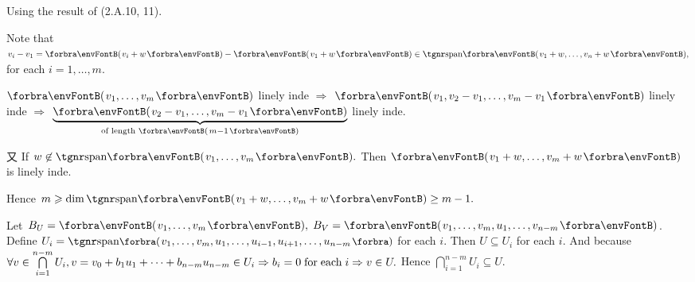 Using the result of (2.A.10, 11).\par\quad
Note that $v_i-v_1=\Par{v_i+w}-\Par{v_1+w}\in\Span{v_1+w,\dots,v_n+w},$ for each $i=1,\dots,m$.\par\quad
$\Par{v_1,\dots,v_m}$ linely inde $\Rightarrow$ $\Par{v_1,v_2-v_1,\dots,v_m-v_1}$ linely inde $\Rightarrow$ $\underbrace{\Par{v_2-v_1,_{}\dots,v_m-v_1}}_{\text{of length }\Par{m-1}}$ linely inde.\vspace{-10pt}\par\quad
又 If $w\not\in\Span{v_1,\dots,v_m}.$ Then $\Par{v_1+w,\dots,v_m+w}$ is linely inde.\par\quad
Hence $m\geqslant\dim\Span{v_1+w,\dots,v_m+w}\geq m-1.$\PfEnd
\SepLine

Let $B_U=\Par{v_1,\dots,v_m},\;B_V=\Par{v_1,\dots,v_m,u_1,\dots,v_{n-m}}$.\parSol{}
Define $U_i=\Span[\BigPar]{v_1,\dots,v_m,u_1,\dots,u_{i-1},u_{i+1},\dots,u_{n-m}}$ for each $i$. Then $U\subseteq U_i$ for each $i.$\vspace{4pt}\parSol{}
And because $\forall v\in \bigcap\limits_{i=1}^{n-m}U_i,v=v_0+b_1 u_1+\dots+b_{n-m} u_{n-m}\in U_i\Rightarrow b_i=0 \text{\;for\;each\;} i\Rightarrow v\in U.$\vspace{-4pt}\parSol{}
Hence $\bigcap\limits_{i=1}^{n-m}U_i\subseteq U.$\PfEnd
\SepLine

